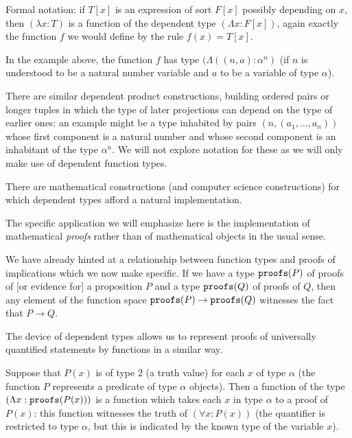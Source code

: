\documentclass[12pt]{slides}
\begin{document}
\begin{slide}

Formal notation:  if $T[x]$ is an expression of sort $F[x]$ possibly depending on $x$, then $(\lambda x:T)$ is a function of the dependent type
$(\Lambda x:F[x])$, again exactly the function $f$ we would define by the rule $f(x)=T[x]$.

In the example above, the function $f$ has type $(\Lambda((n,a):\alpha^n)$ (if $n$ is understood to be a natural number variable and $a$ to be a variable of type $\alpha$).

There are similar dependent product constructions, building ordered pairs or longer tuples in which the type of later projections can depend on the type of earlier ones:  an example might be a type inhabited by pairs $(n,(a_1,\ldots,a_n))$ whose first component is a natural number and whose second component is an inhabitant of the type $\alpha^n$.  We will not explore notation for these as we will only make use of dependent function types.

\end{slide}

\begin{slide}


There are mathematical constructions (and computer science constructions) for which dependent types afford a natural implementation.

The specific application we will emphasize here is the implementation of mathematical {\em proofs\/} rather than of mathematical objects in the usual sense.

We have already hinted at a relationship between function types and proofs of implications which we now make specific.  If we have a type ${\tt proofs}(P)$ of proofs of [or evidence for] a proposition $P$ and a type ${\tt proofs}(Q)$ of proofs of $Q$, then any element of the function space ${\tt proofs}(P) \rightarrow {\tt proofs}(Q)$ witnesses the fact that $P \rightarrow Q$.

\end{slide}

\begin{slide}

The device of dependent types allows us to represent proofs of universally quantified statements by functions in a similar way.

Suppose that $P(x)$ is of type $2$ (a truth value)  for each $x$ of type $\alpha$ (the function $P$ represents a predicate of type $\alpha$ objects).
Then a function of the type $(\Lambda x:{\tt proofs}(P(x)))$ is a function which takes each $x$ in type $\alpha$ to a proof of $P(x)$:  this function witnesses
the truth of $(\forall x:P(x))$ (the quantifier is restricted to type $\alpha$, but this is indicated by the known type of the variable $x$).

\end{slide}
\end{document}
